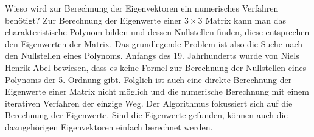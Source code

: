 \begin{refsection}
Wieso wird zur Berechnung der Eigenvektoren ein numerisches Verfahren benötigt?
Zur Berechnung der Eigenwerte einer $3 \times 3$ Matrix kann man das charakteristische Polynom bilden und dessen Nullstellen finden, diese entsprechen den Eigenwerten der Matrix.
Das grundlegende Problem ist also die Suche nach den Nullstellen eines Polynoms.
Anfangs des 19. Jahrhunderts wurde von Niels Henrik Abel bewiesen, dass es keine Formel zur Berechnung der Nullstellen eines Polynoms der 5. Ordnung gibt.
Folglich ist auch eine direkte Berechnung der Eigenwerte einer Matrix nicht möglich und die numerische Berechnung mit einem iterativen Verfahren der einzige Weg.
Der Algorithmus fokussiert sich auf die Berechnung der Eigenwerte.
Sind die Eigenwerte gefunden, können auch die dazugehörigen Eigenvektoren einfach berechnet werden.








\printbibliography[heading=subbibliography]
\end{refsection}

